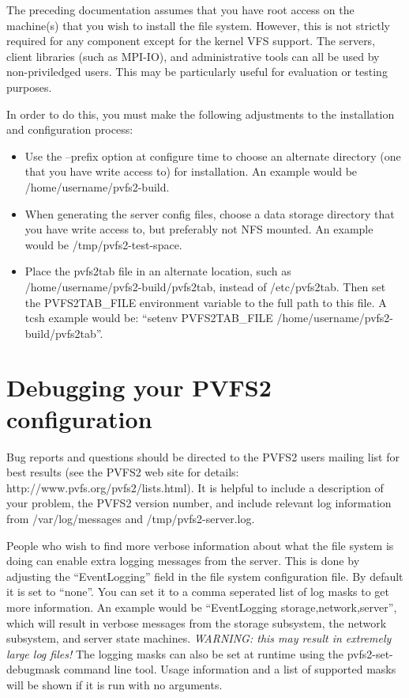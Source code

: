 \documentclass[11pt, letterpaper]{article}
\begin{document}
The preceding documentation assumes that you have root access on the
machine(s) that you wish to install the file system.  However, this is not
strictly required for any component except for the kernel VFS support.  The
servers, client libraries (such as MPI-IO), and administrative tools can all
be used by non-priviledged users.  This may be particularly useful for
evaluation or testing purposes.

In order to do this, you must make the following adjustments to the
installation and configuration process:
\begin{itemize}
\item Use the --prefix option at configure time to choose an alternate
directory (one that you have write access to) for installation.  An example
would be /home/username/pvfs2-build.
\item When generating the server config files, choose a data storage
directory that you have write access to, but preferably not NFS mounted.  An
example would be /tmp/pvfs2-test-space.
\item Place the pvfs2tab file in an alternate location, such as
/home/username/pvfs2-build/pvfs2tab, instead of /etc/pvfs2tab.
Then set the PVFS2TAB\_FILE environment variable to the full path
to this file.  A tcsh example would be: ``setenv PVFS2TAB\_FILE
/home/username/pvfs2-build/pvfs2tab''.
\end{itemize}


\section{Debugging your PVFS2 configuration}

Bug reports and questions should be directed to the PVFS2 users mailing list
for best results (see the PVFS2 web site for details:
http://www.pvfs.org/pvfs2/lists.html).  It is helpful to
include a description of your problem, the PVFS2 version number, and include
relevant log information from /var/log/messages and /tmp/pvfs2-server.log. 

People who wish to find more verbose information about what the file
system is doing can enable extra logging messages from the server.
This is done by adjusting the ``EventLogging'' field in the file system
configuration file.  By default it is set to ``none''.  You can set it to
a comma seperated list of log masks to get more information.  An example
would be ``EventLogging storage,network,server'', which will result
in verbose messages from the storage subsystem, the network subsystem,
and server state machines.  \emph{WARNING: this may result in extremely
large log files!}  The logging masks can also be set at runtime using the
pvfs2-set-debugmask command line tool.  Usage information and a list of
supported masks will be shown if it is run with no arguments.
\end{document}
